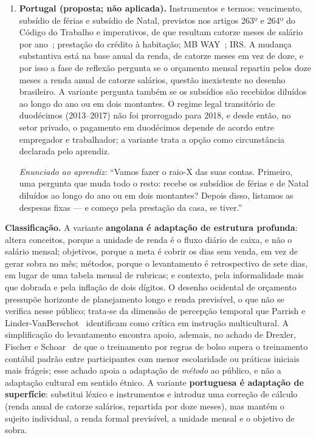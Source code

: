 \begin{enumerate}
\item[(c)] \textbf{Portugal (proposta; não aplicada).} Instrumentos e termos: vencimento, subsídio de férias e subsídio de Natal, previstos nos artigos 263º e 264º do Código do Trabalho e imperativos, de que resultam catorze meses de salário por ano~\cite{ct2009}; prestação do crédito à habitação; MB WAY~\cite{sibs_mbway}; IRS. A mudança substantiva está na base anual da renda, de catorze meses em vez de doze, e por isso a fase de reflexão pergunta se o orçamento mensal repartiu pelos doze meses a renda anual de catorze salários, questão inexistente no desenho brasileiro. A variante pergunta também se os subsídios são recebidos diluídos ao longo do ano ou em dois montantes. O regime legal transitório de duodécimos (2013--2017) não foi prorrogado para 2018, e desde então, no setor privado, o pagamento em duodécimos depende de acordo entre empregador e trabalhador; a variante trata a opção como circunstância declarada pelo aprendiz.

\noindent\textit{Enunciado ao aprendiz:} ``Vamos fazer o raio-X das suas contas. Primeiro, uma pergunta que muda todo o resto: recebe os subsídios de férias e de Natal diluídos ao longo do ano ou em dois montantes? Depois disso, listamos as despesas fixas --- e começo pela prestação da casa, se tiver.''
\end{enumerate}

\noindent\textbf{Classificação.} A variante \textbf{angolana é adaptação de estrutura profunda}: altera conceitos, porque a unidade de renda é o fluxo diário de caixa, e não o salário mensal; objetivos, porque a meta é cobrir os dias sem venda, em vez de gerar sobra no mês; métodos, porque o levantamento é retrospectivo de sete dias, em lugar de uma tabela mensal de rubricas; e contexto, pela informalidade mais que dobrada e pela inflação de dois dígitos. O desenho ocidental de orçamento pressupõe horizonte de planejamento longo e renda previsível, o que não se verifica nesse público; trata-se da dimensão de percepção temporal que Parrish e Linder-VanBerschot~\cite{parrish2010} identificam como crítica em instrução multicultural. A simplificação do levantamento encontra apoio, ademais, no achado de Drexler, Fischer e Schoar~\cite{drexler2014} de que o treinamento por regras de bolso supera o treinamento contábil padrão entre participantes com menor escolaridade ou práticas iniciais mais frágeis; esse achado apoia a adaptação de \emph{método} ao público, e não a adaptação cultural em sentido étnico. A variante \textbf{portuguesa é adaptação de superfície}: substitui léxico e instrumentos e introduz uma correção de cálculo (renda anual de catorze salários, repartida por doze meses), mas mantém o sujeito individual, a renda formal previsível, a unidade mensal e o objetivo de sobra.

